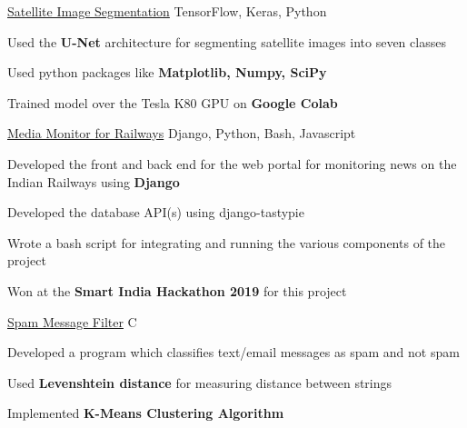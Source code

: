 \begin{cventries}
  \projects
    {} %
    {\href{https://github.com/Nilanshrajput/interiit_techmeet}{Satellite Image Segmentation}} %
    {TensorFlow, Keras, Python} %
    {} %
    {
      \begin{cvitems} %
        \item {Used the \textbf{U-Net} architecture for segmenting satellite images into seven classes}
        \item {Used python packages like \textbf{Matplotlib, Numpy, SciPy}}
        \item {Trained model over the Tesla K80 GPU on \textbf{Google Colab}}
      \end{cvitems}
    }


    \projects
    {} %
    {\href{https://github.com/abhineet99/News-sentiment-SIH19}{Media Monitor for Railways}} %
    {Django, Python, Bash, Javascript} %
    {} %
    {
      \begin{cvitems} %
        \item {Developed the front and back end for the web portal for monitoring news on the Indian Railways using \textbf{Django}}
        \item {Developed the database API(s) using django-tastypie}
        \item {Wrote a bash script for integrating and running the various components of the project}
        \item {Won at the \textbf{Smart India Hackathon 2019} for this project}
      \end{cvitems}
    }


\projects
{} %
 {\href{}{Spam Message Filter}} %
 {C} %
 {} %
 {
   \begin{cvitems} %
     \item {Developed a program which classifies text/email messages as spam and not spam}
     \item {Used \textbf{Levenshtein distance} for measuring distance between strings} 
     \item {Implemented \textbf{K-Means Clustering Algorithm}}
   \end{cvitems}
 }





\end{cventries}
